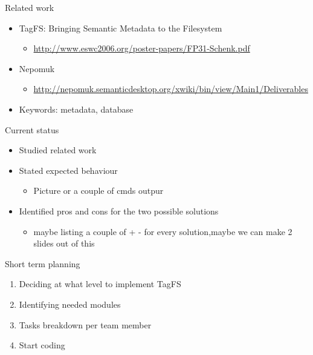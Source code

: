 \documentclass{beamer}
\begin{document}

\begin{frame}{Related work}
    \begin{itemize}
        \item TagFS: Bringing Semantic Metadata to the Filesystem
            \begin{itemize}
                \item \url{http://www.eswc2006.org/poster-papers/FP31-Schenk.pdf}
            \end{itemize}

        \item Nepomuk
            \begin{itemize}
                \item \url{http://nepomuk.semanticdesktop.org/xwiki/bin/view/Main1/Deliverables}
            \end{itemize}

        \item Keywords: metadata, database
    \end{itemize}

\end{frame}

\begin{frame}{Current status}
    \begin{itemize}
        \item Studied related work
        \item Stated expected behaviour
                \begin{itemize}
                    \item Picture or a couple of cmds outpur
                \end{itemize}
        \item Identified pros and cons for the two possible solutions
                \begin{itemize}
                    \item maybe listing a couple of + - for every solution,maybe we
       can make 2 slides out of this
                \end{itemize}
    \end{itemize}
\end{frame}

\begin{frame}{Short term planning}
    \begin{enumerate}
        \item Deciding at what level to implement TagFS
        \item Identifying needed modules
        \item Tasks breakdown per team member
        \item Start coding
    \end{enumerate}
\end{frame}
\end{document}
